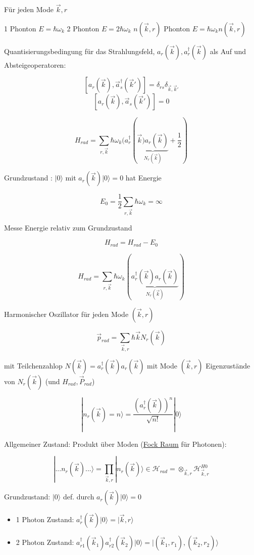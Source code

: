 Für jeden Mode \(\vec k, r\)

1 Phonton \(E= \hbar\omega_k\)
2 Phonton \(E= 2\hbar\omega_k\)
\(n(\vec k,r)\) Phonton \(E= \hbar\omega_k n(\vec k,r)\)


Quantisierungsbedingung für das Strahlungsfeld, \(a_r(\vec k) , a^\dagger_r(\vec k)\) als Auf und Absteigeoperatoren:

\[[a_r(\vec k), \vec a^\dagger_s(\vec k')] = \delta_{rs}\delta_{\vec k,\vec k'}\]
\[[a_r(\vec k), \vec a_s(\vec k')] = 0\]

\[H_{rad} = \sum_{r,\vec k} \hbar\omega_k(a_r^\dagger (\underbrace{\vec k)a_r(\vec k)}_{N_r(\vec k)} +\frac{1}{2})\]

Grundzustand : \(|0\rangle \) mit \(a_r(\vec k) |0\rangle  = 0\) hat Energie

\[ E_0 = \frac{1}{2} \sum_{r,\vec k}\hbar\omega_k = \infty\]

Messe Energie relativ zum Grundzustand 

\[H_{rad} = H_{rad}-E_0\]

\[\boxed{H_{rad} = \sum_{r,\vec k} \hbar\omega_k(\underbrace{a_r^\dagger (\vec k)a_r(\vec k)}_{N_r(\vec k)}) } \]

Harmonischer Oszillator für jeden Mode \((\vec k,r)\)

\[\vec p_{rad} = \sum_{\vec k,r} \hbar\vec k N_r(\vec k)\]

mit Teilchenzahlop \(N(\vec k) = a^\dagger_r(\vec k)a_r(\vec k)\) mit Mode \((\vec k,r)\) Eigenzustände von \(N_r(\vec k)\) (und \(H_{rad},\vec P_{rad}\))

\[|n_r(\vec k)=n\rangle  = \frac{(a^\dagger_r(\vec k))^n}{\sqrt{n!}}|0\rangle \]


Allgemeiner Zustand: Produkt über Moden (\underline{Fock Raum} für Photonen):

\[|... n_r(\vec k)...\rangle  = \prod_{\vec k,r}|n_r(\vec k)\rangle \in \mathcal H_{rad} = \otimes_{\vec k,r}\mathcal H_{\vec k,r}^{H0}\]

Grundzustand: \(|0\rangle \) def. durch \(a_r(\vec k)|0\rangle =0\)

\begin{itemize}
\item 1 Photon Zustand: \(a^\dagger_r(\vec k) |0\rangle = |\vec k,r\rangle  \)
\item 2 Photon Zustand: \(a^\dagger_{r1} (\vec k_1) a^\dagger_{r2} (\vec k_2)   |0\rangle = |(\vec k_1,r_1),(\vec k_2,r_2)\rangle   \)
\end{itemize}

